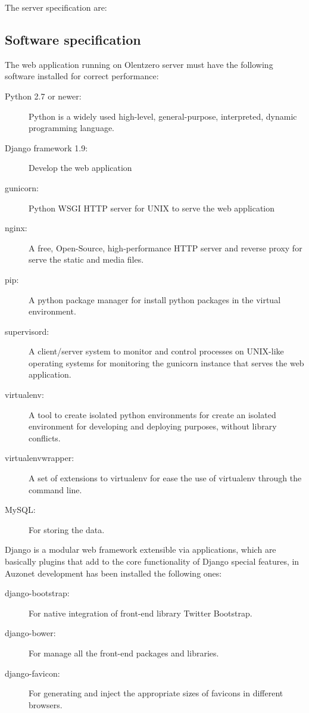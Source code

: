 \documentclass{DeustoFDP}
\begin{document}
The server specification are:

\subsection{Software specification}
The web application running on Olentzero server must have the following software installed for correct performance:

\begin{description}
	\item[Python 2.7 or newer:] Python is a widely used high-level, general-purpose, interpreted, dynamic programming language.
	\item[Django framework 1.9:] Develop the web application
	\item[gunicorn:] Python WSGI HTTP server for UNIX to serve the web application
	\item[nginx:] A free, Open-Source, high-performance HTTP server and reverse proxy for serve the static and media files.
	\item[pip:] A python package manager for install python packages in the virtual environment.
	\item[supervisord:] A client/server system to monitor and control processes on UNIX-like operating systems for monitoring the gunicorn instance that serves the web application.
	\item[virtualenv:] A tool to create isolated python environments for create an isolated environment for developing and deploying purposes, without library conflicts.
	\item[virtualenvwrapper:] A set of extensions to virtualenv for ease the use of virtualenv through the command line.
	\item[MySQL:] For storing the data.
\end{description}

Django is a modular web framework extensible via applications, which are basically plugins that add to the core functionality of Django special features, in Auzonet development has been installed the following ones:

\begin{description}
	\item[django-bootstrap:] For native integration of front-end library Twitter Bootstrap.
	\item[django-bower:] For manage all the front-end packages and libraries.
	\item[django-favicon:] For generating and inject the appropriate sizes of favicons in different browsers. 
\end{description}
\end{document}
